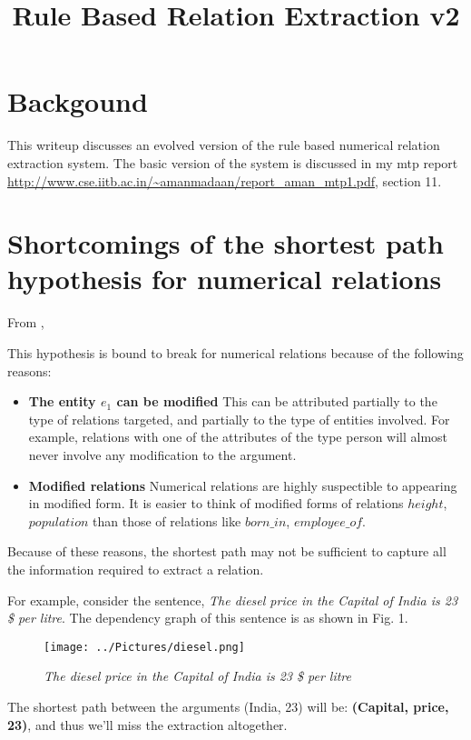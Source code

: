 \documentclass[a4paper,10pt]{article}
\title{Rule Based Relation Extraction v2}
\author{}
\begin{document}
\maketitle

\section{Backgound}
This writeup discusses an evolved version of the rule based numerical relation extraction system. The basic version of the system is discussed in my mtp report \url{http://www.cse.iitb.ac.in/~amanmadaan/report_aman_mtp1.pdf}, section 11.

\section{Shortcomings of the shortest path hypothesis for numerical relations}
From \cite{shortestpathdep}, \emph{}

This hypothesis is bound to break for numerical relations because of the following reasons:

\begin{itemize}
 \item \textbf{The entity $e_1$ can be modified}
 This can be attributed partially to the type of 
 relations targeted, and partially to the type of entities involved. 
 For example, relations with one of the attributes of the type person will almost never involve any modification to the argument.
 
 \item \textbf{Modified relations}
 Numerical relations are highly suspectible to appearing in modified form. It is easier to think of modified forms of 
 relations $height$, $population$ than those of relations like $born\_in$, $employee\_of$.
 \end{itemize}


 Because of these reasons, the shortest path may not be sufficient to capture all the information required to extract a relation.


 For example, consider the sentence, \emph{The diesel price in the Capital of India is 23 \$ per litre}.
 The dependency graph of this sentence is as shown in Fig. 1.
\begin{center}
\begin{figure}[h]
 \texttt{[image: ../Pictures/diesel.png]}
 \caption{\emph{The diesel price in the Capital of India is 23 \$ per litre}}
 \end{figure}
\end{center}
The shortest path between the arguments (India, 23) will be:
\textbf{(Capital, price, 23)}, and thus we'll miss the extraction altogether.
\end{document}
